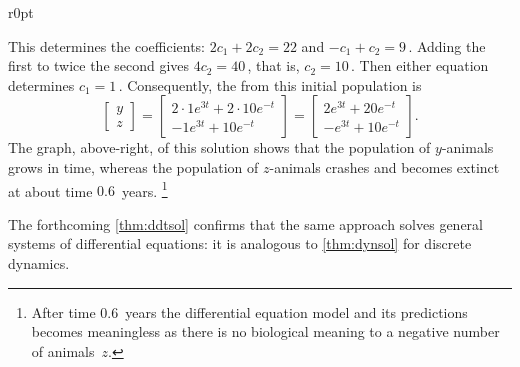 \begin{wrapfigure}r{0pt}
\end{wrapfigure}
This determines the coefficients: \(2c_1+2c_2=22\)
and \(-c_1+c_2=9\)\,.
Adding the first to twice the second gives \(4c_2=40\)\,, that is, \(c_2=10\)\,.
Then either equation determines \(c_1=1\)\,.
Consequently, the  from this initial population is
\begin{equation*}
\begin{bmatrix} y\\z \end{bmatrix}
=\begin{bmatrix} 2\cdot1e^{3t}+2\cdot10e^{-t}
\\ -1e^{3t}+10e^{-t}\end{bmatrix}
=\begin{bmatrix} 2e^{3t}+20e^{-t}
\\ -e^{3t}+10e^{-t}\end{bmatrix}.
\end{equation*}
The graph, above-right, of this solution shows that the population of \(y\)-animals grows in time, whereas the population of \(z\)-animals crashes and becomes extinct at about time \(0.6\)~years.%
\footnote{After time \(0.6\)~years the differential equation model  and its predictions becomes meaningless as there is no biological meaning to a negative number of animals~\(z\).}


The forthcoming \cref{thm:ddtsol} confirms that the same approach solves general systems of differential equations: it is analogous to \cref{thm:dynsol} for discrete dynamics.



